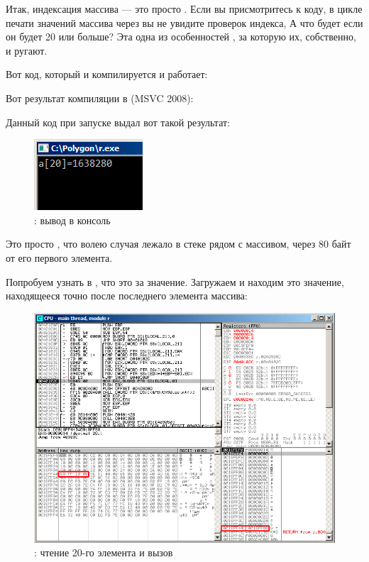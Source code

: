
Итак, индексация массива --- это просто .  %
Если вы присмотритесь к коду, в цикле печати значений массива через \printf вы 
не увидите проверок индекса,  
А что будет если он будет 20 или больше? 
Эта одна из особенностей \CCpp, за которую их, собственно, и ругают.

Вот код, который и компилируется и работает:



Вот результат компиляции в (MSVC 2008):



Данный код при запуске выдал вот такой результат:

\begin{figure}[h]
\centering
\includegraphics[scale=\NormalScale]{patterns/13_arrays/2_BO/olly_r3.png}
\caption{\olly: вывод в консоль}
\label{fig:array_BO_olly_r3}
\end{figure}

Это просто , что волею случая лежало в стеке рядом с массивом, 
через 80 байт от его первого элемента.

\clearpage
\myindex{\olly}
Попробуем узнать в \olly, что это за значение.
Загружаем и находим это значение, находящееся точно после последнего элемента массива:

\begin{figure}[H]
\centering
\includegraphics[scale=\FigScale]{patterns/13_arrays/2_BO/olly_r1.png}
\caption{\olly: чтение 20-го элемента и вызов \printf}
\label{fig:array_BO_olly_r1}
\end{figure}

